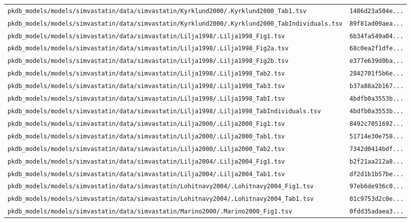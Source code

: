 \begin{longtable}{ll}
\texttt{pkdb\_models/models/simvastatin/data/simvastatin/Kyrklund2000/.Kyrklund2000\_Tab1.tsv} & \texttt{1486d23a504e...} \\
\texttt{pkdb\_models/models/simvastatin/data/simvastatin/Kyrklund2000/.Kyrklund2000\_TabIndividuals.tsv} & \texttt{89f81ad09aea...} \\
\texttt{pkdb\_models/models/simvastatin/data/simvastatin/Lilja1998/.Lilja1998\_Fig1.tsv} & \texttt{6b34fa549a04...} \\
\texttt{pkdb\_models/models/simvastatin/data/simvastatin/Lilja1998/.Lilja1998\_Fig2a.tsv} & \texttt{68c0ea2f1dfe...} \\
\texttt{pkdb\_models/models/simvastatin/data/simvastatin/Lilja1998/.Lilja1998\_Fig2b.tsv} & \texttt{e377e639d0ba...} \\
\texttt{pkdb\_models/models/simvastatin/data/simvastatin/Lilja1998/.Lilja1998\_Tab2.tsv} & \texttt{2842701f5b6e...} \\
\texttt{pkdb\_models/models/simvastatin/data/simvastatin/Lilja1998/.Lilja1998\_Tab3.tsv} & \texttt{b37a88a2b167...} \\
\texttt{pkdb\_models/models/simvastatin/data/simvastatin/Lilja1998/.Lilja1998\_TabI.tsv} & \texttt{4bdfb0a3553b...} \\
\texttt{pkdb\_models/models/simvastatin/data/simvastatin/Lilja1998/.Lilja1998\_TabIndividuals.tsv} & \texttt{4bdfb0a3553b...} \\
\texttt{pkdb\_models/models/simvastatin/data/simvastatin/Lilja2000/.Lilja2000\_Fig1.tsv} & \texttt{8492c7051692...} \\
\texttt{pkdb\_models/models/simvastatin/data/simvastatin/Lilja2000/.Lilja2000\_Tab1.tsv} & \texttt{51714e30e758...} \\
\texttt{pkdb\_models/models/simvastatin/data/simvastatin/Lilja2000/.Lilja2000\_Tab2.tsv} & \texttt{7342d0414bdf...} \\
\texttt{pkdb\_models/models/simvastatin/data/simvastatin/Lilja2004/.Lilja2004\_Fig1.tsv} & \texttt{b2f21aa212a8...} \\
\texttt{pkdb\_models/models/simvastatin/data/simvastatin/Lilja2004/.Lilja2004\_Tab1.tsv} & \texttt{df2d1b1b57be...} \\
\texttt{pkdb\_models/models/simvastatin/data/simvastatin/Lohitnavy2004/.Lohitnavy2004\_Fig1.tsv} & \texttt{97eb6de936c0...} \\
\texttt{pkdb\_models/models/simvastatin/data/simvastatin/Lohitnavy2004/.Lohitnavy2004\_Tab1.tsv} & \texttt{01c9753d2c0e...} \\
\texttt{pkdb\_models/models/simvastatin/data/simvastatin/Marino2000/.Marino2000\_Fig1.tsv} & \texttt{0fdd35adaea3...} \\

\end{longtable}

